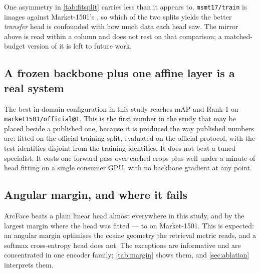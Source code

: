 One asymmetry in \cref{tab:fitsplit} carries less than it appears to. \texttt{msmt17/train} is
\nHeadImagesMsmt{} images against Market-1501's \nHeadImages{}, so which of the two splits
yields the better \emph{transfer} head is confounded with how much data each head saw. The
mirror above is read within a column and does not rest on that comparison; a matched-budget
version of it is left to future work.

\subsection{A frozen backbone plus one affine layer is a real system}
The best in-domain configuration in this study reaches \bestMarketMAP{} mAP and
\bestMarketRone{} Rank-1 on \texttt{market1501/official@1}. This is the first number in the
study that may be placed beside a published one, because it is produced the way published
numbers are: fitted on the official training split, evaluated on the official protocol, with
the test identities disjoint from the training identities. It does not beat a tuned
specialist. It costs one forward pass over \nHeadImages{} cached crops plus well under a
minute of head fitting on a single consumer GPU, with no backbone gradient at any point.

\subsection{Angular margin, and where it fails}
ArcFace beats a plain linear head almost everywhere in this study, and by the largest margin
where the head was fitted --- \leadMarketLinear{} to \leadMarketArc{} on Market-1501. This is
expected: an angular margin optimises the cosine geometry the retrieval metric reads, and a
softmax cross-entropy head does not. The exceptions are informative and are concentrated in one
encoder family; \cref{tab:margin} shows them, and \cref{sec:ablation} interprets them.

\begin{table}[t]
\centering
\caption{Relative change in mAP from replacing the linear head with the ArcFace head, same
features and same budget. Positive is the expected direction. The losses cluster in DINOv3's
feature space on transfer sets, and both DINOv3 probes reach a perfect training accuracy, so
they are not fit failures.}
\label{tab:margin}
\scriptsize
\setlength{\tabcolsep}{3pt}

\end{table}

